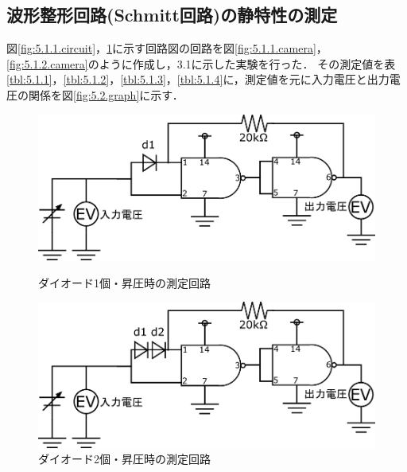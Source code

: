 \documentclass[10pt, a4j, dvipdfmx]{jarticle}
\makeatletter
\newcommand{\figcaption}[1]{\def\@captype{figure}\caption{#1}}
\makeatother
\begin{document}
\subsection{波形整形回路(Schmitt回路)の静特性の測定}
図\ref{fig:5.1.1.circuit}，\ref{fig:5.1.2.circuit}に示す回路図の回路を図\ref{fig:5.1.1.camera}，\ref{fig:5.1.2.camera}のように作成し，3.1に示した実験を行った．
その測定値を表\ref{tbl:5.1.1}，\ref{tbl:5.1.2}，\ref{tbl:5.1.3}，\ref{tbl:5.1.4}に，測定値を元に入力電圧と出力電圧の関係を図\ref{fig:5.2.graph}に示す．
\begin{figure}[H]
  \begin{minipage}{0.5\hsize}
    \centering
    \includegraphics[width=0.9\hsize]{images/Experiment/5_1_1_circuit.png}
    \figcaption{ダイオード1個・昇圧時の測定回路}
	\label{fig:5.1.1.circuit}
  \end{minipage}
  \begin{minipage}{0.5\hsize}
    \centering
    \includegraphics[width=0.9\hsize]{images/Experiment/5_1_2_circuit.png}
    \caption{ダイオード2個・昇圧時の測定回路}
	\label{fig:5.1.2.circuit}
  \end{minipage}
\end{figure}
\end{document}
